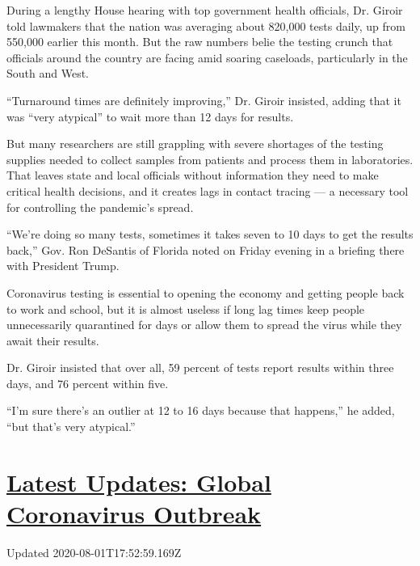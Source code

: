 During a lengthy House hearing with top government health officials, Dr.
Giroir told lawmakers that the nation was averaging about 820,000 tests
daily, up from 550,000 earlier this month. But the raw numbers belie the
testing crunch that officials around the country are facing amid soaring
caseloads, particularly in the South and West.

``Turnaround times are definitely improving,'' Dr. Giroir insisted,
adding that it was ``very atypical'' to wait more than 12 days for
results.

But many researchers are still grappling with severe shortages of the
testing supplies needed to collect samples from patients and process
them in laboratories. That leaves state and local officials without
information they need to make critical health decisions, and it creates
lags in contact tracing --- a necessary tool for controlling the
pandemic's spread.

``We're doing so many tests, sometimes it takes seven to 10 days to get
the results back,'' Gov. Ron DeSantis of Florida noted on Friday evening
in a briefing there with President Trump.

Coronavirus testing is essential to opening the economy and getting
people back to work and school, but it is almost useless if long lag
times keep people unnecessarily quarantined for days or allow them to
spread the virus while they await their results.

Dr. Giroir insisted that over all, 59 percent of tests report results
within three days, and 76 percent within five.

``I'm sure there's an outlier at 12 to 16 days because that happens,''
he added, ``but that's very atypical.''

\hypertarget{latest-updates-global-coronavirus-outbreak}{%
\section{\texorpdfstring{\href{https://www.nytimes.com/2020/08/01/world/coronavirus-covid-19.html?action=click\&pgtype=Article\&state=default\&region=MAIN_CONTENT_1\&context=storylines_live_updates}{Latest
Updates: Global Coronavirus
Outbreak}}{Latest Updates: Global Coronavirus Outbreak}}\label{latest-updates-global-coronavirus-outbreak}}

Updated 2020-08-01T17:52:59.169Z

